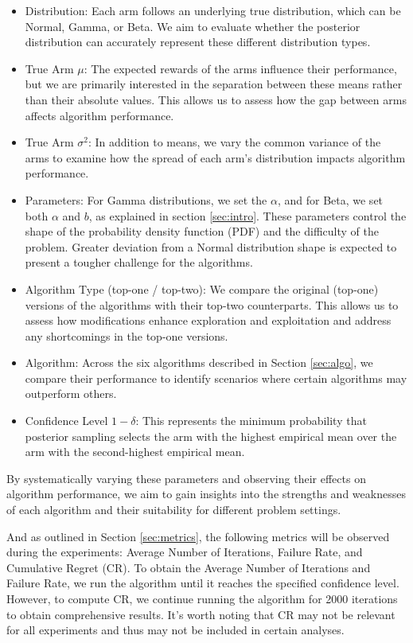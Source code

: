 \documentclass[a4paper, 12pt]{article}
\theoremstyle{definition}
\begin{document}
\begin{itemize}
\item Distribution: Each arm follows an underlying true distribution, which can be Normal, Gamma, or Beta. We aim to evaluate whether the posterior distribution can accurately represent these different distribution types.
\item True Arm $\mu$: The expected rewards of the arms influence their performance, but we are primarily interested in the separation between these means rather than their absolute values. This allows us to assess how the gap between arms affects algorithm performance.
\item True Arm $\sigma^2$: In addition to means, we vary the common variance of the arms to examine how the spread of each arm's distribution impacts algorithm performance.
\item Parameters: For Gamma distributions, we set the $\alpha$, and for Beta, we set both $\alpha$ and $b$, as explained in section \ref{sec:intro}. These parameters control the shape of the probability density function (PDF) and the difficulty of the problem. Greater deviation from a Normal distribution shape is expected to present a tougher challenge for the algorithms.
\item Algorithm Type (top-one / top-two): We compare the original (top-one) versions of the algorithms with their top-two counterparts. This allows us to assess how modifications enhance exploration and exploitation and address any shortcomings in the top-one versions.
\item Algorithm: Across the six algorithms described in Section \ref{sec:algo}, we compare their performance to identify scenarios where certain algorithms may outperform others.
\item Confidence Level $1-\delta$: This represents the minimum probability that posterior sampling selects the arm with the highest empirical mean over the arm with the second-highest empirical mean.
\end{itemize}

By systematically varying these parameters and observing their effects on algorithm performance, we aim to gain insights into the strengths and weaknesses of each algorithm and their suitability for different problem settings.

And as outlined in Section \ref{sec:metrics}, the following metrics will be observed during the experiments: Average Number of Iterations, Failure Rate, and Cumulative Regret (CR). To obtain the Average Number of Iterations and Failure Rate, we run the algorithm until it reaches the specified confidence level. However, to compute CR, we continue running the algorithm for 2000 iterations to obtain comprehensive results. It's worth noting that CR may not be relevant for all experiments and thus may not be included in certain analyses.
\end{document}
